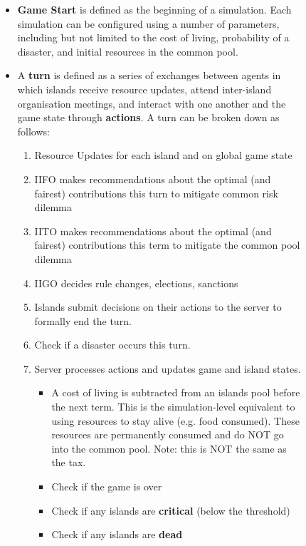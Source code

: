 \begin{figure}[!htb]
    \begin{itemize}
        \item \textbf{Game Start} is defined as the beginning of a simulation. Each simulation can be configured using a number of parameters, including but not limited to the cost of living, probability of a disaster, and initial resources in the common pool.
        \item A \textbf{turn} is defined as a series of exchanges between agents in which islands receive resource updates, attend inter-island organisation meetings, and interact with one another and the game state through \textbf{actions}. A turn can be broken down as follows:
            \begin{enumerate}
                \item Resource Updates for each island and on global game state
                \item IIFO makes recommendations about the optimal (and fairest) contributions this turn to mitigate common risk dilemma 
                \item IITO makes recommendations about the optimal (and fairest) contributions this term to mitigate the common pool dilemma
                \item IIGO decides rule changes, elections, sanctions
                \item Islands submit decisions on their actions to the server to formally end the turn.
                \item Check if a disaster occurs this turn.
                \item Server processes actions and updates game and island states.
                    \begin{itemize}
                        \item A cost of living is subtracted from an islands pool before the next term. This is the simulation-level equivalent to using resources to stay alive (e.g. food consumed). These resources are permanently consumed and do NOT go into the common pool. Note: this is NOT the same as the tax. 
                        \item Check if the game is over
                        \item Check if any islands are \textbf{critical} (below the threshold)
                        \item Check if any islands are \textbf{dead}

\end{itemize}
\end{enumerate}
\end{itemize}
\end{figure}
